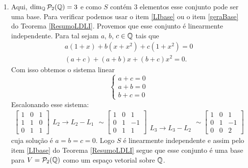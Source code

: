 \begin{exemplos}
\begin{exemplos}
\begin{solucao}
\begin{enumerate}
      \item Aqui, $\dim_{\mathbb{Q}}\mathcal{P}_2(\mathbb{Q}) = 3$ e como $S$ contém 3 elementos esse conjunto pode ser uma base. Para verificar podemos usar o item \ref{LIbase} ou o item \ref{geraBase} do Teorema \ref{ResumoLDLI}. Provemos que esse conjunto é linearmente independente. Para tal sejam $a$, $b$, $c \in \mathbb{Q}$ tais que
        \begin{align*}
          a(1 + x) + b(x + x^2) + c(1 + x^2) = 0\\
          (a + c) + (a + b)x + (b + c)x^2 = 0.
        \end{align*}
        Com isso obtemos o sistema linear
        \[
          \begin{cases}
            a + c = 0\\
            a + b = 0\\
            b + c = 0
          \end{cases}
        \]
        Escalonando esse sistema:
        \begin{align*}
          \begin{bmatrix}
            1 & 0 & 1\\
            1 & 1 & 0\\
            0 & 1 & 1
          \end{bmatrix}
          \begin{array}{l}
            \phantom{x}\\L_2 \to L_2 - L_1\\\phantom{x}
          \end{array}\sim
          \begin{bmatrix}
            1 & 0 & 1\\
            0 & 1 & -1\\
            0 & 1 & 1
          \end{bmatrix}
          \begin{array}{l}
            \phantom{x}\\\phantom{x}\\L_3 \to L_3 - L_2
          \end{array}\sim
          \begin{bmatrix}
            1 & 0 & 1\\
            0 & 1 & -1\\
            0 & 0 & 2
          \end{bmatrix}
        \end{align*}
        cuja solução é $a = b = c = 0$. Logo $S$ é linearmente independente e assim pelo item \ref{LIbase} do Teorema \ref{ResumoLDLI} segue que esse conjunto é uma base para $V = \mathcal{P}_2(\mathbb{Q})$ como um espaço vetorial sobre $\mathbb{Q}$.
    \end{enumerate}
  \end{solucao}
\end{exemplos}
      

\end{exemplos}
